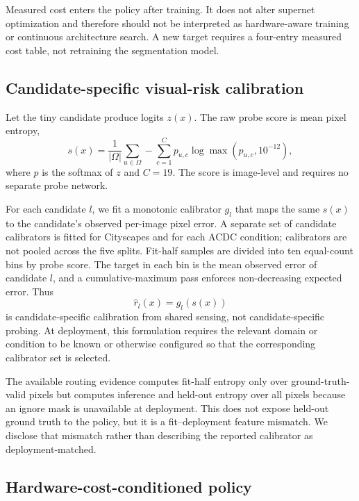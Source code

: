 \documentclass[a4paper,review,12pt]{elsarticle}
\begin{document}
Measured cost enters the policy after training. It does not alter supernet optimization and therefore should not be interpreted as hardware-aware training or continuous architecture search. A new target requires a four-entry measured cost table, not retraining the segmentation model.

\subsection{Candidate-specific visual-risk calibration}
\label{sec:calibration}

Let the tiny candidate produce logits $z(x)$. The raw probe score is mean pixel entropy,
\begin{equation}
s(x)=\frac{1}{|\Omega|}\sum_{u\in\Omega}-\sum_{c=1}^{C}p_{u,c}\log\max(p_{u,c},10^{-12}),
\label{eq:entropy}
\end{equation}
where $p$ is the softmax of $z$ and $C=19$. The score is image-level and requires no separate probe network.

For each candidate $l$, we fit a monotonic calibrator $g_l$ that maps the same $s(x)$ to the candidate's observed per-image pixel error. A separate set of candidate calibrators is fitted for Cityscapes and for each ACDC condition; calibrators are not pooled across the five splits. Fit-half samples are divided into ten equal-count bins by probe score. The target in each bin is the mean observed error of candidate $l$, and a cumulative-maximum pass enforces non-decreasing expected error. Thus
\begin{equation}
\widehat{r}_l(x)=g_l(s(x))
\label{eq:risk}
\end{equation}
is candidate-specific calibration from shared sensing, not candidate-specific probing. At deployment, this formulation requires the relevant domain or condition to be known or otherwise configured so that the corresponding calibrator set is selected.

The available routing evidence computes fit-half entropy only over ground-truth-valid pixels but computes inference and held-out entropy over all pixels because an ignore mask is unavailable at deployment. This does not expose held-out ground truth to the policy, but it is a fit--deployment feature mismatch. We disclose that mismatch rather than describing the reported calibrator as deployment-matched.

\subsection{Hardware-cost-conditioned policy}
\label{sec:policy}
\end{document}
